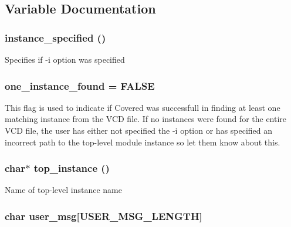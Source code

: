 \subsection{Variable Documentation}
\subsubsection{ instance\_\-specified ()}\label{vcd_8c_a2}


Specifies if -i option was specified 
\subsubsection{ one\_\-instance\_\-found = FALSE}\label{vcd_8c_a3}


This flag is used to indicate if Covered was successfull in finding at least one matching instance from the VCD file. If no instances were found for the entire VCD file, the user has either not specified the -i option or has specified an incorrect path to the top-level module instance so let them know about this. 
\subsubsection{\setlength{\rightskip}{0pt plus 5cm}char$\ast$ top\_\-instance ()}\label{vcd_8c_a1}


Name of top-level instance name 
\subsubsection{\setlength{\rightskip}{0pt plus 5cm}char user\_\-msg[USER\_\-MSG\_\-LENGTH]}\label{vcd_8c_a0}


